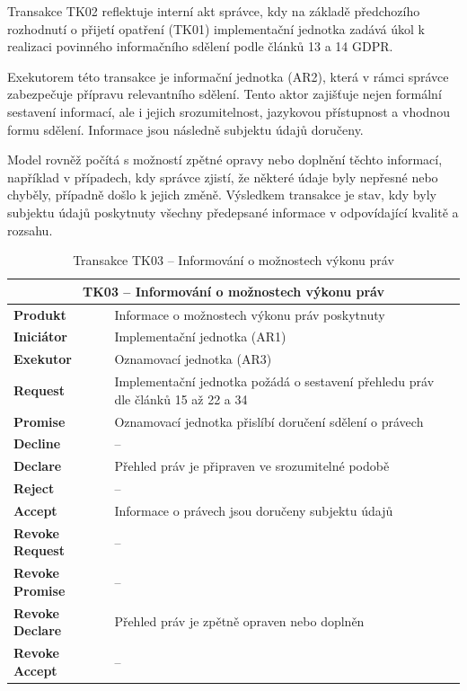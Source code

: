 \begin{itemize}
  Transakce TK02 reflektuje interní akt správce, kdy na základě předchozího rozhodnutí o přijetí opatření (TK01) implementační jednotka zadává úkol k realizaci povinného informačního sdělení podle článků 13 a 14 GDPR.

  Exekutorem této transakce je informační jednotka (AR2), která v rámci správce zabezpečuje přípravu relevantního sdělení. Tento aktor zajišťuje nejen formální sestavení informací, ale i jejich srozumitelnost, jazykovou přístupnost a vhodnou formu sdělení. Informace jsou následně subjektu údajů doručeny.

  Model rovněž počítá s možností zpětné opravy nebo doplnění těchto informací, například v případech, kdy správce zjistí, že některé údaje byly nepřesné nebo chyběly, případně došlo k jejich změně. Výsledkem transakce je stav, kdy byly subjektu údajů poskytnuty všechny předepsané informace v odpovídající kvalitě a rozsahu.

  \begin{table}[H]
    \centering
    \renewcommand{\arraystretch}{1.2}
    \begin{tabular}{|p{3.1cm}|p{9.9cm}|}
    \hline
    \multicolumn{2}{|c|}{\textbf{TK03 – Informování o možnostech výkonu práv}} \\
    \hline
    \textbf{Produkt} & Informace o možnostech výkonu práv poskytnuty \\
    \hline
    \textbf{Iniciátor} & Implementační jednotka (AR1) \\
    \hline
    \textbf{Exekutor} & Oznamovací jednotka (AR3) \\
    \hline
    \textbf{Request} & Implementační jednotka požádá o sestavení přehledu práv dle článků 15 až 22 a 34 \\
    \hline
    \textbf{Promise} & Oznamovací jednotka přislíbí doručení sdělení o právech \\
    \hline
    \textbf{Decline} & – \\
    \hline
    \textbf{Declare} & Přehled práv je připraven ve srozumitelné podobě \\
    \hline
    \textbf{Reject} & – \\
    \hline
    \textbf{Accept} & Informace o právech jsou doručeny subjektu údajů \\
    \hline
    \textbf{Revoke Request} & – \\
    \hline
    \textbf{Revoke Promise} & – \\
    \hline
    \textbf{Revoke Declare} & Přehled práv je zpětně opraven nebo doplněn \\
    \hline
    \textbf{Revoke Accept} & – \\
    \hline
    \end{tabular}
    \caption{Transakce TK03 – Informování o možnostech výkonu práv}
  \end{table}
  


\end{itemize}
